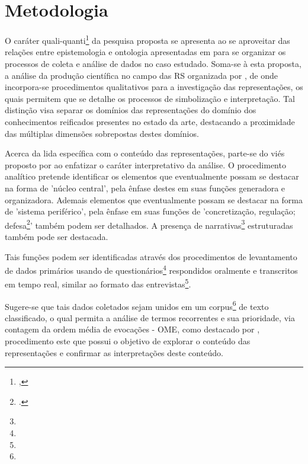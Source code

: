 \documentclass[
  12pt,       %
  openright,      %
  twoside,      %
  a4paper,      %
  english,      %
  french,       %
  spanish,      %
  brazil        %
  ]{abntex2}
\begin{document}
\chapter{Metodologia}


O caráter quali-quanti\footnote{, {}} da pesquisa proposta se apresenta ao se aproveitar das relações entre epistemologia e ontologia apresentadas em  para se organizar os processos de coleta e análise de dados no caso estudado. Soma-se à esta proposta, a análise da produção científica no campo das RS organizada por , de onde incorpora-se procedimentos qualitativos para a investigação das representações, os quais permitem que se detalhe os processos de simbolização e interpretação. Tal distinção visa separar os domínios das representações do domínio dos conhecimentos reificados presentes no estado da arte, destacando a proximidade das múltiplas dimensões sobrepostas destes domínios.

Acerca da lida específica com o conteúdo das representações, parte-se do viés proposto por  ao enfatizar o caráter interpretativo da análise. O procedimento analítico pretende identificar os elementos que eventualmente possam se destacar na forma de 'núcleo central', pela ênfase destes em suas funções generadora e organizadora. Ademais elementos que eventualmente possam se destacar na forma de 'sistema periférico', pela ênfase em suas funções de 'concretização, regulação; defesa\footnote{.}' também podem ser detalhados. A presença de narrativas\footnote{} estruturadas também pode ser destacada.

Tais funções podem ser identificadas através dos procedimentos de levantamento de dados primários usando de questionários\footnote{} respondidos oralmente e transcritos em tempo real, similar ao formato das entrevistas\footnote{}. 

Sugere-se que tais dados coletados sejam unidos em um corpus\footnote{} de texto classificado, o qual permita a análise de termos recorrentes e sua prioridade, via contagem da ordem média de evocações - OME, como destacado por , procedimento este que possui o objetivo de explorar o conteúdo das representações e confirmar as interpretações deste conteúdo.
\end{document}
